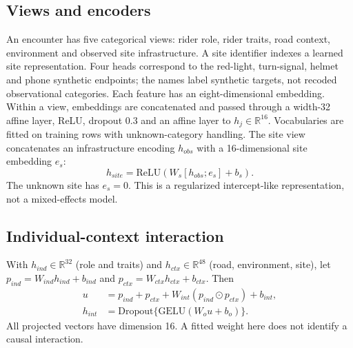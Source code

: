 \documentclass[9pt, conference, a4paper, compsocconf]{IEEEtran}
\begin{document}
\subsection{Views and encoders}
An encounter has five categorical views: rider role, rider traits, road context, environment and observed site infrastructure. A site identifier indexes a learned site representation. Four heads correspond to the red-light, turn-signal, helmet and phone synthetic endpoints; the names label synthetic targets, not recoded observational categories. Each feature has an eight-dimensional embedding. Within a view, embeddings are concatenated and passed through a width-32 affine layer, ReLU, dropout 0.3 and an affine layer to $h_j\in\mathbb{R}^{16}$. Vocabularies are fitted on training rows with unknown-category handling. The site view concatenates an infrastructure encoding $h_{obs}$ with a 16-dimensional site embedding $e_s$:
\begin{equation}
h_{site}=\mathrm{ReLU}(W_s[h_{obs};e_s]+b_s).
\end{equation}
The unknown site has $e_s=0$. This is a regularized intercept-like representation, not a mixed-effects model.

\subsection{Individual-context interaction}
With $h_{ind}\in\mathbb{R}^{32}$ (role and traits) and $h_{ctx}\in\mathbb{R}^{48}$ (road, environment, site), let $p_{ind}=W_{ind}h_{ind}+b_{ind}$ and $p_{ctx}=W_{ctx}h_{ctx}+b_{ctx}$. Then
\begin{align}
u&=p_{ind}+p_{ctx}+W_{int}(p_{ind}\odot p_{ctx})+b_{int},\\
h_{int}&=\mathrm{Dropout}\{\mathrm{GELU}(W_ou+b_o)\}.
\end{align}
All projected vectors have dimension 16. A fitted weight here does not identify a causal interaction.
\end{document}
